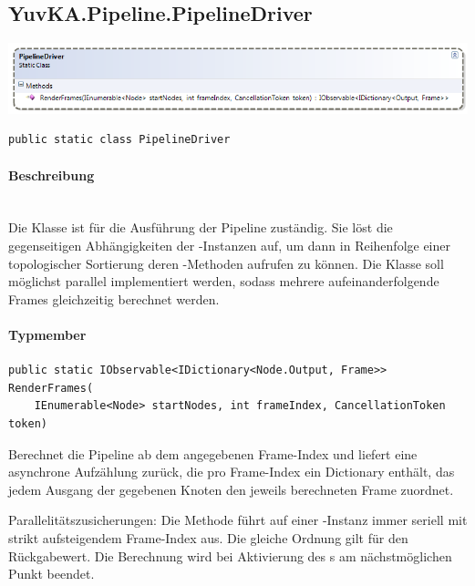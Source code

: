 \subsection{YuvKA.Pipeline.PipelineDriver}

\includegraphics[width=\textwidth]{YuvKA.Pipeline/driver.png}
\begin{verbatim}
public static class PipelineDriver
\end{verbatim}

\paragraph{Beschreibung}~\\
Die Klasse  ist für die Ausführung der Pipeline zuständig. Sie löst die gegenseitigen Abhängigkeiten der -Instanzen auf, um dann in Reihenfolge einer topologischer Sortierung deren -Methoden aufrufen zu können.
Die Klasse soll möglichst parallel implementiert werden, sodass mehrere aufeinanderfolgende Frames gleichzeitig berechnet werden.

\paragraph{Typmember}
\begin{itemize}

	\begin{verbatim}
public static IObservable<IDictionary<Node.Output, Frame>> RenderFrames(
    IEnumerable<Node> startNodes, int frameIndex, CancellationToken token)
    \end{verbatim}
	Berechnet die Pipeline ab dem angegebenen Frame-Index und liefert eine asynchrone Aufzählung zurück, die pro Frame-Index ein Dictionary enthält, das jedem Ausgang der gegebenen Knoten  den jeweils berechneten Frame zuordnet.

    Parallelitätszusicherungen: Die Methode führt auf einer -Instanz  immer seriell mit strikt aufsteigendem Frame-Index aus. Die gleiche Ordnung gilt für den Rückgabewert. Die Berechnung wird bei Aktivierung des s am nächstmöglichen Punkt beendet.

\end{itemize}
